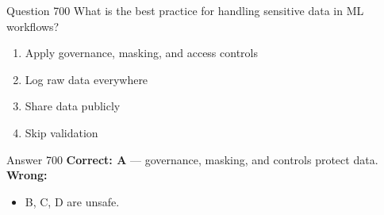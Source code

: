 \documentclass[aspectratio=169,11pt]{beamer}
\begin{document}
	\begin{frame}{Question 700}
		What is the best practice for handling sensitive data in ML workflows?
		\begin{enumerate}[label=\Alph*.]
			\item Apply governance, masking, and access controls
			\item Log raw data everywhere
			\item Share data publicly
			\item Skip validation
		\end{enumerate}
	\end{frame}
	\begin{frame}{Answer 700}
		\textbf{Correct: A} --- governance, masking, and controls protect data.\\
		\vspace{0.5em}
		\textbf{Wrong:}
		\begin{itemize}
			\item B, C, D are unsafe.
		\end{itemize}
	\end{frame}
	
\end{document}
